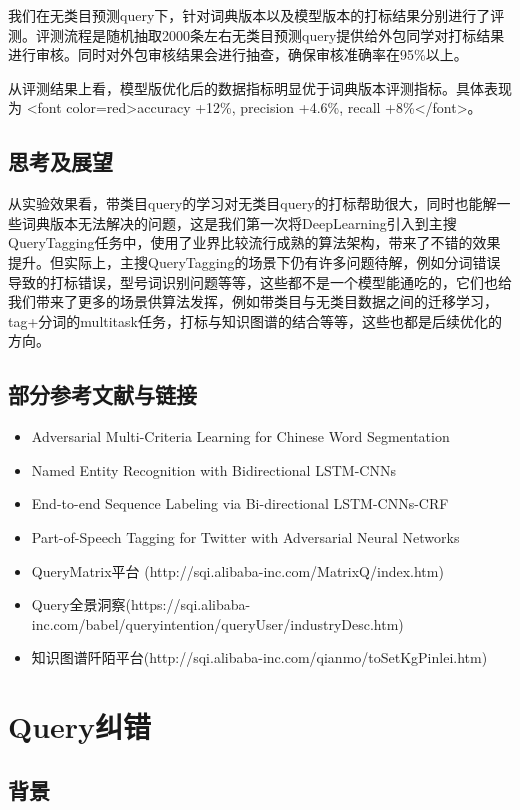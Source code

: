 我们在无类目预测query下，针对词典版本以及模型版本的打标结果分别进行了评测。评测流程是随机抽取2000条左右无类目预测query提供给外包同学对打标结果进行审核。同时对外包审核结果会进行抽查，确保审核准确率在95\%以上。

\par 从评测结果上看，模型版优化后的数据指标明显优于词典版本评测指标。具体表现为
<font color=red>accuracy +12\%, precision +4.6\%, recall +8\%</font>。


\subsection{思考及展望}
从实验效果看，带类目query的学习对无类目query的打标帮助很大，同时也能解一些词典版本无法解决的问题，这是我们第一次将DeepLearning引入到主搜QueryTagging任务中，使用了业界比较流行成熟的算法架构，带来了不错的效果提升。但实际上，主搜QueryTagging的场景下仍有许多问题待解，例如分词错误导致的打标错误，型号词识别问题等等，这些都不是一个模型能通吃的，它们也给我们带来了更多的场景供算法发挥，例如带类目与无类目数据之间的迁移学习，tag+分词的multitask任务，打标与知识图谱的结合等等，这些也都是后续优化的方向。

\subsection{部分参考文献与链接}
\begin{itemize}
\item Adversarial Multi-Criteria Learning for Chinese Word Segmentation
\item Named Entity Recognition with Bidirectional LSTM-CNNs
\item End-to-end Sequence Labeling via Bi-directional LSTM-CNNs-CRF
\item Part-of-Speech Tagging for Twitter with Adversarial Neural Networks
\item QueryMatrix平台 (http://sqi.alibaba-inc.com/MatrixQ/index.htm)
\item Query全景洞察(https://sqi.alibaba-inc.com/babel/queryintention/queryUser/industryDesc.htm)
\item 知识图谱阡陌平台(http://sqi.alibaba-inc.com/qianmo/toSetKgPinlei.htm)
\end{itemize}

\section{Query纠错}
\subsection{背景}

